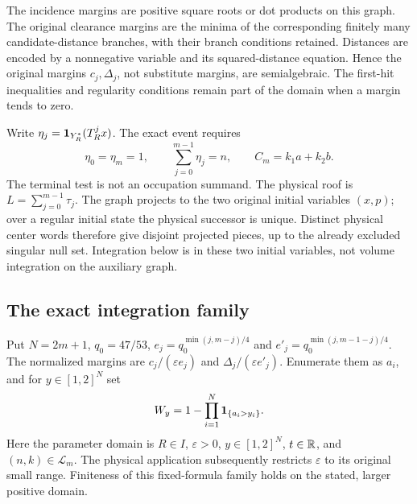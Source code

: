 The incidence margins are positive square roots or dot products on
this graph. The original clearance margins are the minima of the
corresponding finitely many candidate-distance branches, with their
branch conditions retained. Distances are encoded by a nonnegative
variable and its squared-distance equation. Hence the original
margins $c_j,\Delta_j$, not substitute margins, are semialgebraic.
The first-hit inequalities and regularity conditions remain part of
the domain when a margin tends to zero.

Write $\eta_j=\mathbf1_{Y_R^*}(T_R^jx)$. The exact event requires
\[
 \eta_0=\eta_m=1,\qquad
 \sum_{j=0}^{m-1}\eta_j=n,\qquad C_m=k_1a+k_2b.
\]
The terminal test is not an occupation summand. The physical roof
is $L=\sum_{j=0}^{m-1}\tau_j$. The graph projects to the two original
initial variables $(x,p)$; over a regular initial state the physical
successor is unique. Distinct physical center words therefore give
disjoint projected pieces, up to the already excluded singular
null set. Integration below is in these two initial variables,
not volume integration on the auxiliary graph.

\subsection{The exact integration family}
Put $N=2m+1$, $q_0=47/53$,
$e_j=q_0^{\min(j,m-j)/4}$ and
$e'_j=q_0^{\min(j,m-1-j)/4}$. The normalized margins are
$c_j/(\varepsilon e_j)$ and $\Delta_j/(\varepsilon e'_j)$.
Enumerate them as $a_i$, and for $y\in[1,2]^N$ set
\[
 W_y=1-\prod_{i=1}^N\mathbf1_{\{a_i>y_i\}}.
\]
Here the parameter domain is $R\in I$, $\varepsilon>0$,
$y\in[1,2]^N$, $t\in\mathbb R$, and $(n,k)\in\mathscr L_m$.
The physical application subsequently restricts $\varepsilon$ to
its original small range. Finiteness of this fixed-formula family
holds on the stated, larger positive domain.


